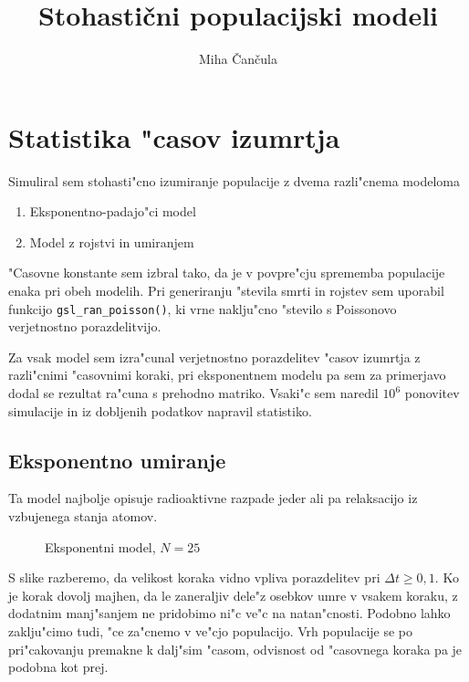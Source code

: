 \documentclass[a4paper,10pt]{article}
\title{Stohasti\v cni populacijski modeli}
\author{Miha \v Can\v cula}
\begin{document}
\maketitle

\newcommand{\poisson}[2]{
  \frac{#2^{#1}}{#1!} e^{-#2}  
}

\newcommand{\poi}[1]{\poisson{#1}{\overline{#1}}}

\section{Statistika "casov izumrtja}

Simuliral sem stohasti"cno izumiranje populacije z dvema razli"cnema modeloma
\begin{enumerate}
 \item Eksponentno-padajo"ci model
 \item Model z rojstvi in umiranjem
\end{enumerate}

"Casovne konstante sem izbral tako, da je v povpre"cju sprememba populacije enaka pri obeh modelih. Pri generiranju "stevila smrti in rojstev sem uporabil funkcijo \texttt{gsl\_ran\_poisson()}, ki vrne naklju"cno "stevilo s Poissonovo verjetnostno porazdelitvijo. 

Za vsak model sem izra"cunal verjetnostno porazdelitev "casov izumrtja z razli"cnimi "casovnimi koraki, pri eksponentnem modelu pa sem za primerjavo dodal se rezultat ra"cuna s prehodno matriko. Vsaki"c sem naredil $10^6$ ponovitev simulacije in iz dobljenih podatkov napravil statistiko. 

\subsection{Eksponentno umiranje}

Ta model najbolje opisuje radioaktivne razpade jeder ali pa relaksacijo iz vzbujenega stanja atomov. 

\begin{figure}

\caption{Eksponentni model, $N=25$}
\end{figure}

S slike razberemo, da velikost koraka vidno vpliva porazdelitev pri $\Delta t \geq 0,1$. Ko je korak dovolj majhen, da le zaneraljiv dele"z osebkov umre v vsakem koraku, z dodatnim manj"sanjem ne pridobimo ni"c ve"c na natan"cnosti. Podobno lahko zaklju"cimo tudi, "ce za"cnemo v ve"cjo populacijo.  Vrh populacije se po pri"cakovanju premakne k dalj"sim "casom, odvisnost od "casovnega koraka pa je podobna kot prej. 
\end{document}
